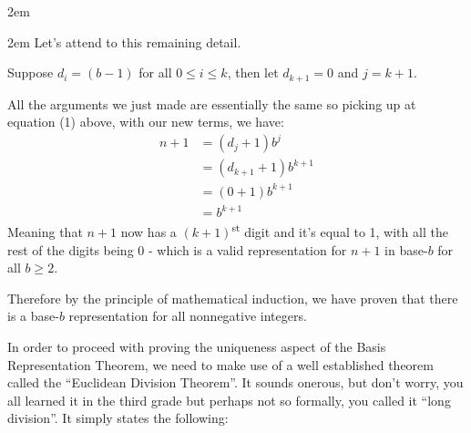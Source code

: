\documentclass{article}
\newenvironment{jprIn}{\begin{adjustwidth}{2em}{}}{\end{adjustwidth}}
\begin{document}
\begin{jprIn}
\begin{jprIn}
Let's attend to this remaining detail.

Suppose $d_i=(b-1)$ for all $0\le{}i\le{}k$, then let $d_{k+1}=0$ and $j=k+1$.

All the arguments we just made are essentially the same so picking up at equation (1) above, with our new terms, we have:
\begin{align*}
n+1 &=(d_j+1)b^j\\
&=(d_{k+1}+1)b^{k+1}\\
&=(0+1)b^{k+1}\\
&=b^{k+1}
\end{align*}
Meaning that $n+1$ now has a $(k+1)$\textsuperscript{st} digit and it's equal to 1,
with all the rest of the digits being 0 - which is a valid representation for $n+1$ in base-$b$ for all $b\ge2$.
\end{jprIn}
Therefore 
by the principle of mathematical induction,
we have proven that there is a base-$b$ representation for all nonnegative integers.
\end{jprIn}
\bigskip

In order to proceed
with proving the uniqueness aspect of the Basis Representation Theorem, we
need to make use of a well established theorem
called the ``Euclidean Division Theorem''.
It sounds onerous, but don’t worry, you all learned it
in the third grade but perhaps not so formally, you called it ``long division''. It simply states the following:

\break
\end{document}
